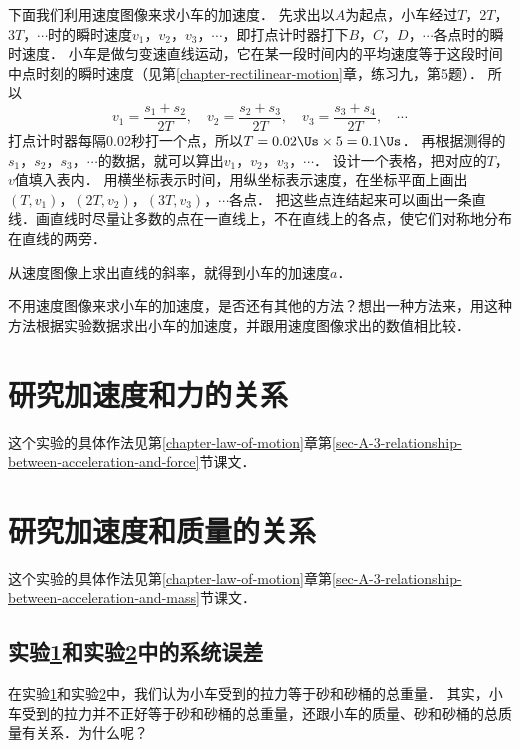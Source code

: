 下面我们利用速度图像来求小车的加速度．
先求出以$A$为起点，小车经过$T $，$ 2T $，$ 3T $，$ \cdots$时的瞬时速度$v_1 $，$ v_2 $，$ v_3 $，$ \cdots$，即打点计时器打下$B $，$ C $，$ D $，$ \cdots$各点时的瞬时速度．
小车是做匀变速直线运动，它在某一段时间内的平均速度等于这段时间中点时刻的瞬时速度（见第\ref{chapter-rectilinear-motion}章，练习九，第5题）．
所以
\[v_1=\frac{s_1+s_2}{2T}, \quad  v_2=\frac{s_2+s_3}{2T},  \quad v_3=\frac{s_3+s_4}{2T},  \quad  \cdots\]
打点计时器每隔0.02秒打一个点，所以$T=0.02 \Us \times 5=0.1\Us$．
再根据测得的$s_1 $，$ s_2 $，$ s_3 $，$ \cdots$的数据，就可以算出$v_1 $，$ v_2 $，$ v_3 $，$ \cdots$．
设计一个表格，把对应的$T $，$ v$值填入表内．
用横坐标表示时间，用纵坐标表示速度，在坐标平面上画出$(T,v_1) $，$ (2T,v_2) $，$ (3T,v_3) $，$ \cdots$各点．
把这些点连结起来可以画出一条直线．画直线时尽量让多数的点在一直线上，不在直线上的各点，使它们对称地分布在直线的两旁．

从速度图像上求出直线的斜率，就得到小车的加速度$a$．

不用速度图像来求小车的加速度，是否还有其他的方法？想出一种方法来，用这种方法根据实验数据求出小车的加速度，并跟用速度图像求出的数值相比较．

\section{研究加速度和力的关系}\label{sec-A-app-1-8-studying-the-relationship-between-acceleration-and-force}
这个实验的具体作法见第\ref{chapter-law-of-motion}章第\ref{sec-A-3-relationship-between-acceleration-and-force}节课文．

\section{研究加速度和质量的关系}\label{sec-A-app-1-9-studying-the-relationship-between-acceleration-and-mass}
这个实验的具体作法见第\ref{chapter-law-of-motion}章第\ref{sec-A-3-relationship-between-acceleration-and-mass}节课文．

\subsection*{实验\ref{sec-A-app-1-8-studying-the-relationship-between-acceleration-and-force}和实验\ref{sec-A-app-1-9-studying-the-relationship-between-acceleration-and-mass}中的系统误差}
在实验\ref{sec-A-app-1-8-studying-the-relationship-between-acceleration-and-force}和实验\ref{sec-A-app-1-9-studying-the-relationship-between-acceleration-and-mass}中，我们认为小车受到的拉力等于砂和砂桶的总重量．
其实，小车受到的拉力并不正好等于砂和砂桶的总重量，还跟小车的质量、砂和砂桶的总质量有关系．为什么呢？

